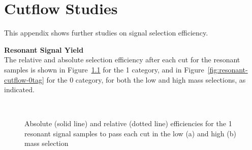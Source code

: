 \chapter{Cutflow Studies}\label{app:cutflows}

This appendix shows further studies on signal selection efficiency. 

\noindent \textbf{Resonant Signal Yield}\\
\indent The relative and absolute selection efficiency after each cut for the resonant samples is shown in Figure~\ref{fig:resonant-cutflow-1tag} for the 1 \btag category, and in Figure~\ref{fig:resonant-cutflow-0tag} for the 0 \btag category, for both the low and high mass selections, as indicated.



\begin{figure}[!b]
    \centering
    \\
    \caption[Absolute and relative efficiencies for the 1 \btag category, high mass selection]{Absolute (solid line) and relative (dotted line) efficiencies for the 1 \btag resonant signal samples to pass each cut in the low (a) and high (b) mass selection}
    \label{fig:resonant-cutflow-1tag}
  \end{figure}


